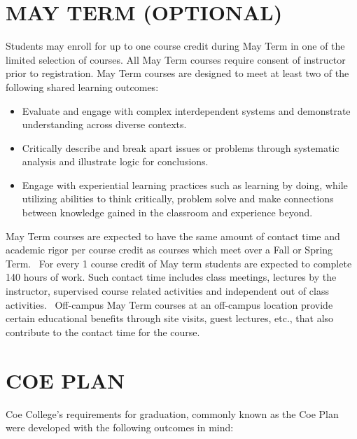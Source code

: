 \documentclass[
  letterpaper,
]{scrbook}
\providecommand{\tightlist}{%
  \setlength{\itemsep}{0pt}\setlength{\parskip}{0pt}}
\begin{document}
\hypertarget{may-term-optional}{%
\section*{MAY TERM (OPTIONAL)}\label{may-term-optional}}


Students may enroll for up to one course credit during May Term in one
of the limited selection of courses. All May Term courses require
consent of instructor prior to registration. May Term courses are
designed to meet at least two of the following shared learning outcomes:

\begin{itemize}
\tightlist
\item
  Evaluate and engage with complex interdependent systems and
  demonstrate understanding across diverse contexts.
\item
  Critically describe and break apart issues or problems through
  systematic analysis and illustrate logic for conclusions.
\item
  Engage with experiential learning practices such as learning by doing,
  while utilizing abilities to think critically, problem solve and make
  connections between knowledge gained in the classroom and experience
  beyond.
\end{itemize}

May Term courses are expected to have the same amount of contact time
and academic rigor per course credit as courses which meet over a Fall
or Spring Term.~ For every 1 course credit of May term students are
expected to complete 140 hours of work. Such contact time includes class
meetings, lectures by the instructor, supervised course related
activities and independent out of class activities.~ Off-campus May Term
courses at an off-campus location provide certain educational benefits
through site visits, guest lectures, etc., that also contribute to the
contact time for the course.

\hypertarget{coe-plan}{%
\section*{COE PLAN}\label{coe-plan}}


Coe College's requirements for graduation, commonly known as the Coe
Plan were developed with the following outcomes in mind:
\end{document}
